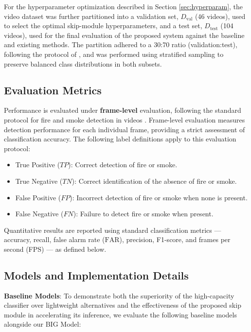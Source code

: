 \documentclass[
  10pt,
]{article}
\providecommand{\tightlist}{%
  \setlength{\itemsep}{0pt}\setlength{\parskip}{0pt}}
\begin{document}
For the hyperparameter optimization described in Section
\ref{sec:hyperparam}, the video dataset was further partitioned into a
validation set, \(D_{\text{val}}\) (46 videos), used to select the
optimal skip-module hyperparameters, and a test set, \(D_{\text{test}}\)
(104 videos), used for the final evaluation of the proposed system
against the baseline and existing methods. The partition adhered to a
30:70 ratio (validation:test), following the protocol of
, and was performed using
stratified sampling to preserve balanced class distributions in both
subsets.

\subsection{Evaluation Metrics}\label{sec:metrics}

Performance is evaluated under \textbf{frame-level} evaluation,
following the standard protocol for fire and smoke detection in videos
. Frame-level evaluation
measures detection performance for each individual frame, providing a
strict assessment of classification accuracy. The following label
definitions apply to this evaluation protocol:

\begin{itemize}
\tightlist
\item
  True Positive (\(TP\)): Correct detection of fire or smoke.
\item
  True Negative (\(TN\)): Correct identification of the absence of fire
  or smoke.
\item
  False Positive (\(FP\)): Incorrect detection of fire or smoke when
  none is present.
\item
  False Negative (\(FN\)): Failure to detect fire or smoke when present.
\end{itemize}

Quantitative results are reported using standard classification metrics
--- accuracy, recall, false alarm rate (\(\mathrm{FAR}\)), precision,
F1-score, and frames per second (FPS) --- as defined below.



\subsection{Models and Implementation Details}\label{sec:baselines}

\textbf{Baseline Models}: To demonstrate both the superiority of the
high-capacity classifier over lightweight alternatives and the
effectiveness of the proposed skip module in accelerating its inference,
we evaluate the following baseline models alongside our BIG Model:
\end{document}
